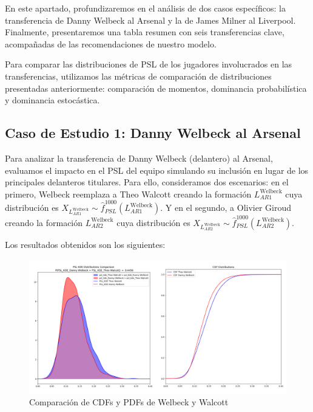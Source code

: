 \documentclass[
  a4paper,
]{article}
\begin{document}
En este apartado, profundizaremos en el análisis de dos casos
específicos: la transferencia de Danny Welbeck al Arsenal y la de James
Milner al Liverpool. Finalmente, presentaremos una tabla resumen con
seis transferencias clave, acompañadas de las recomendaciones de nuestro
modelo.

Para comparar las distribuciones de PSL de los jugadores involucrados en
las transferencias, utilizamos las métricas de comparación de
distribuciones presentadas anteriormente: comparación de momentos,
dominancia probabilística y dominancia estocástica.

\hypertarget{caso-de-estudio-1-danny-welbeck-al-arsenal}{%
\subsection{Caso de Estudio 1: Danny Welbeck al
Arsenal}\label{caso-de-estudio-1-danny-welbeck-al-arsenal}}

Para analizar la transferencia de Danny Welbeck (delantero) al Arsenal,
evaluamos el impacto en el PSL del equipo simulando su inclusión en
lugar de los principales delanteros titulares. Para ello, consideramos
dos escenarios: en el primero, Welbeck reemplaza a Theo Walcott creando
la formación \(L_{AR1}^{\text{Welbeck}}\) cuya distribución es
\(X_{L_{AR1}^{\text{Welbeck}}} \sim \hat{f}^{1000}_{PSL}(L_{AR1}^{\text{Welbeck}})\).
Y en el segundo, a Olivier Giroud creando la formación
\(L_{AR2}^{\text{Welbeck}}\) cuya distribución es
\(X_{L_{AR2}^{\text{Welbeck}}} \sim \hat{f}^{1000}_{PSL}(L_{AR2}^{\text{Welbeck}})\).

Los resultados obtenidos son los siguientes:

\begin{figure}
  \includegraphics{recursos_pdf/graficos/Welbeck_Walcott.png}
    \caption{Comparación de CDFs y PDFs de Welbeck y Walcott}
\end{figure}
\end{document}
